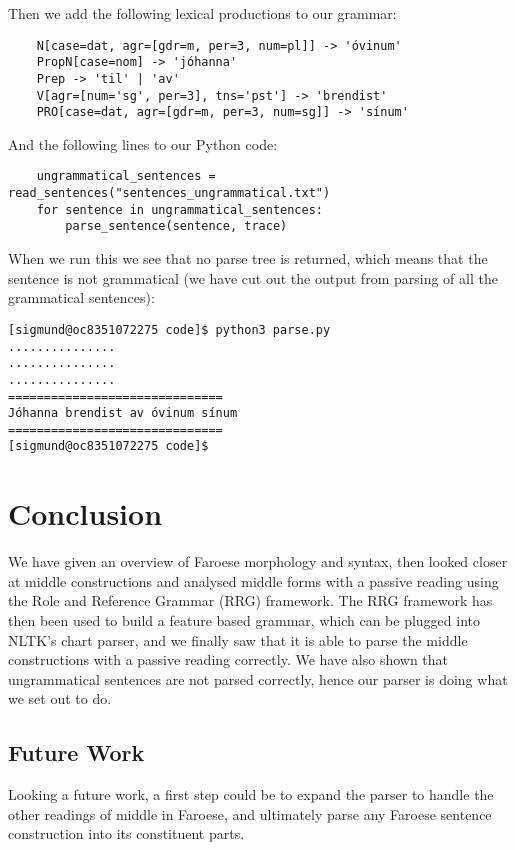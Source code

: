 \documentclass[12pt,%
]{lin-v2/lin}
\let\Oldsubsection\subsection
\renewcommand{\subsection}{\FloatBarrier\Oldsubsection}
\begin{document}
Then we add the following lexical productions to our grammar:
\begin{lstlisting}
    N[case=dat, agr=[gdr=m, per=3, num=pl]] -> 'óvinum'
    PropN[case=nom] -> 'jóhanna'
    Prep -> 'til' | 'av'
    V[agr=[num='sg', per=3], tns='pst'] -> 'brendist'
    PRO[case=dat, agr=[gdr=m, per=3, num=sg]] -> 'sínum'
\end{lstlisting}

And the following lines to our Python code:
\begin{lstlisting}
    ungrammatical_sentences = read_sentences("sentences_ungrammatical.txt")
    for sentence in ungrammatical_sentences:
        parse_sentence(sentence, trace)
\end{lstlisting}

When we run this we see that no parse tree is returned, which means that the sentence
is not grammatical (we have cut out the output from parsing of all the grammatical sentences):
\begin{lstlisting}
[sigmund@oc8351072275 code]$ python3 parse.py
...............
...............
...............
==============================
Jóhanna brendist av óvinum sínum
==============================
[sigmund@oc8351072275 code]$
\end{lstlisting}


\section{Conclusion}

We have given an overview of Faroese morphology and syntax, then looked closer at middle
constructions and analysed middle forms with a passive reading using the Role and Reference Grammar (RRG) framework.
The RRG framework has then been used to build a feature based grammar, which can be plugged
into NLTK's chart parser, and we finally saw that it is able to parse the middle constructions
with a passive reading correctly. We have also shown that ungrammatical sentences are not parsed
correctly, hence our parser is doing what we set out to do.


\subsection{Future Work}

Looking a future work, a first step could be to expand the parser to handle the other readings
of middle in Faroese, and ultimately parse any Faroese sentence construction into its constituent parts.\\\\


    

\end{document}
